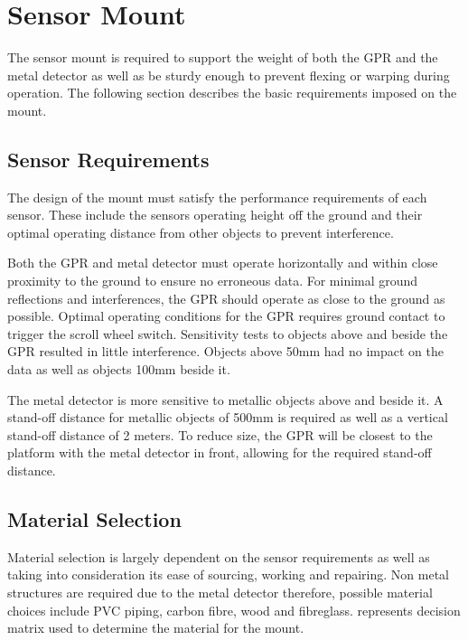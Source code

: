 \documentclass[main.tex]{subfiles}
\begin{document}
\section{Sensor Mount}
The sensor mount is required to support the weight of both the GPR and the metal detector as well as be sturdy enough to prevent flexing or warping during operation. The following section describes the basic requirements imposed on the mount.  
\subsection {Sensor Requirements } 
The design of the mount must satisfy the performance requirements of each sensor. These include the sensors operating height off the ground and their optimal operating distance from other objects to prevent interference. 

Both the GPR and metal detector must operate horizontally and within close proximity to the ground to ensure no erroneous data.
For minimal ground reflections and interferences, the GPR should operate as close to the ground as possible. Optimal operating conditions for the GPR requires ground contact to trigger the scroll wheel switch. Sensitivity tests to objects above and beside the GPR resulted in little interference. Objects above 50mm had no impact on the data as well as objects 100mm beside it. 

The metal detector is more sensitive to metallic objects above and beside it. A stand-off distance for metallic objects of 500mm is required as well as a vertical stand-off distance of 2 meters. To reduce size, the GPR will be closest to the platform with the metal detector in front, allowing for the required stand-off distance.  
\subsection {Material Selection}  
Material selection is largely dependent on the sensor requirements as well as taking into consideration its ease of sourcing, working and repairing. Non metal structures are required due to the metal detector therefore, possible material choices include PVC piping, carbon fibre, wood and fibreglass.  represents decision matrix used to determine the material for the mount.
\end{document}

